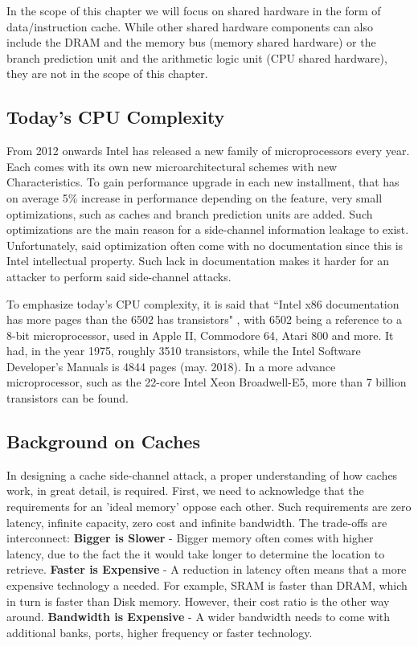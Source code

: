 In the scope of this chapter we will focus on shared hardware in the form of data/instruction cache. While other shared hardware components can also include the DRAM and the memory bus (memory shared hardware) or the branch prediction unit and the arithmetic logic unit (CPU shared hardware), they are not in the scope of this chapter.

\subsection{Today's CPU Complexity}
\label{subsec:todaycpucomplex}
From 2012 onwards Intel has released a new family of microprocessors every year. Each comes with its own new microarchitectural schemes with new Characteristics. To gain performance upgrade in each new installment, that has on average 5\% increase in performance depending on the feature, very small optimizations, such as caches and branch prediction units are added. Such optimizations are the main reason for a side-channel information leakage to exist. Unfortunately, said optimization often come with no documentation since this is Intel intellectual property. Such lack in documentation makes it harder for an attacker to perform said side-channel attacks.

To emphasize today's CPU complexity, it is said that ``Intel x86 documentation has more pages than the 6502 has transistors" \cite{IntMan}, with 6502 being a reference to a 8-bit microprocessor, used in Apple II, Commodore 64, Atari 800 and more. It had, in the year 1975, roughly 3510 transistors, while the Intel Software Developer's Manuals is 4844 pages (may. 2018). In a more advance microprocessor, such as the 22-core Intel Xeon Broadwell-E5, more than 7 billion transistors can be found. 

\subsection{Background on Caches}
\label{subsec:backgroundoncaches}
In designing a cache side-channel attack, a proper understanding of how caches work, in great detail, is required. First, we need to acknowledge that the requirements for an 'ideal memory' oppose each other. Such requirements are zero latency, infinite capacity, zero cost and infinite bandwidth. The trade-offs are interconnect: \textbf{Bigger is Slower} - Bigger memory often comes with higher latency, due to the fact the it would take longer to determine the location to retrieve.  \textbf{Faster is Expensive} - A reduction in latency often means that a more expensive technology a needed. For example, SRAM is faster than DRAM, which in turn is faster than Disk memory. However, their cost ratio is the other way around. \textbf{Bandwidth is Expensive} - A wider bandwidth needs to come with additional banks, ports, higher frequency or faster technology. 

